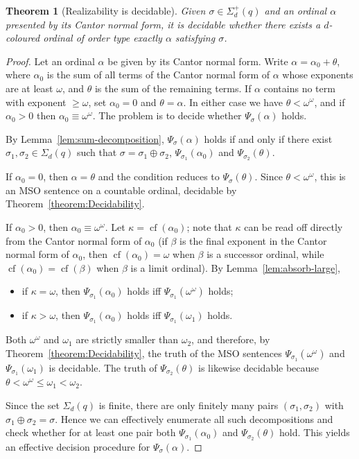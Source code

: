 \documentclass{amsart}
\newcommand{\cf}{\operatorname{cf}}
\newtheorem{theorem}{Theorem}
\theoremstyle{definition}
\begin{document}
\begin{theorem}[Realizability is decidable]\label{cor:realizability}
    Given $\sigma\in\Sigma_d^+(q)$ and an ordinal $\alpha$ presented by its Cantor normal form, it is decidable whether there exists a $d$-coloured ordinal of order type exactly $\alpha$ satisfying $\sigma$.
\end{theorem}
\begin{proof}
    Let an ordinal $\alpha$ be given by its Cantor normal form. Write $\alpha=\alpha_0+\theta$, where $\alpha_0$ is the sum of all terms of the Cantor normal form of $\alpha$ whose exponents are at least $\omega$, and $\theta$ is the sum of the remaining terms. If $\alpha$ contains no term with exponent $\ge\omega$, set $\alpha_0=0$ and $\theta=\alpha$. In either case we have $\theta<\omega^\omega$, and if $\alpha_0>0$ then $\alpha_0\equiv\omega^\omega$. The problem is to decide whether $\Psi_\sigma(\alpha)$ holds.

    By Lemma~\ref{lem:sum-decomposition}, $\Psi_\sigma(\alpha)$ holds if and only if there exist $\sigma_1,\sigma_2\in\Sigma_d(q)$ such that $\sigma=\sigma_1\oplus\sigma_2$, $\Psi_{\sigma_1}(\alpha_0)$ and $\Psi_{\sigma_2}(\theta)$.

    If $\alpha_0=0$, then $\alpha=\theta$ and the condition reduces to $\Psi_\sigma(\theta)$. Since $\theta<\omega^\omega$, this is an MSO sentence on a countable ordinal, decidable by Theorem~\ref{theorem:Decidability}.

    If $\alpha_0>0$, then $\alpha_0\equiv\omega^\omega$. Let $\kappa=\cf(\alpha_0)$; note that $\kappa$ can be read off directly from the Cantor normal form of $\alpha_0$ (if $\beta$ is the final exponent in the Cantor normal form of $\alpha_0$, then $\operatorname{cf}(\alpha_0)=\omega$ when $\beta$ is a successor ordinal, while $\operatorname{cf}(\alpha_0)=\operatorname{cf}(\beta)$ when $\beta$ is a limit ordinal). By Lemma~\ref{lem:absorb-large},
    \begin{itemize}
        \item if $\kappa=\omega$, then $\Psi_{\sigma_1}(\alpha_0)$ holds iff $\Psi_{\sigma_1}(\omega^\omega)$ holds;
        \item if $\kappa>\omega$, then $\Psi_{\sigma_1}(\alpha_0)$ holds iff $\Psi_{\sigma_1}(\omega_1)$ holds.
    \end{itemize}
    Both $\omega^\omega$ and $\omega_1$ are strictly smaller than $\omega_2$, and therefore, by Theorem~\ref{theorem:Decidability}, the truth of the MSO sentences $\Psi_{\sigma_1}(\omega^\omega)$ and $\Psi_{\sigma_1}(\omega_1)$ is decidable. The truth of $\Psi_{\sigma_2}(\theta)$ is likewise decidable because $\theta<\omega^\omega\le\omega_1<\omega_2$.

    Since the set $\Sigma_d(q)$ is finite, there are only finitely many pairs $(\sigma_1,\sigma_2)$ with $\sigma_1\oplus\sigma_2=\sigma$. Hence we can effectively enumerate all such decompositions and check whether for at least one pair both $\Psi_{\sigma_1}(\alpha_0)$ and $\Psi_{\sigma_2}(\theta)$ hold. This yields an effective decision procedure for $\Psi_\sigma(\alpha)$.
\end{proof}
\end{document}

